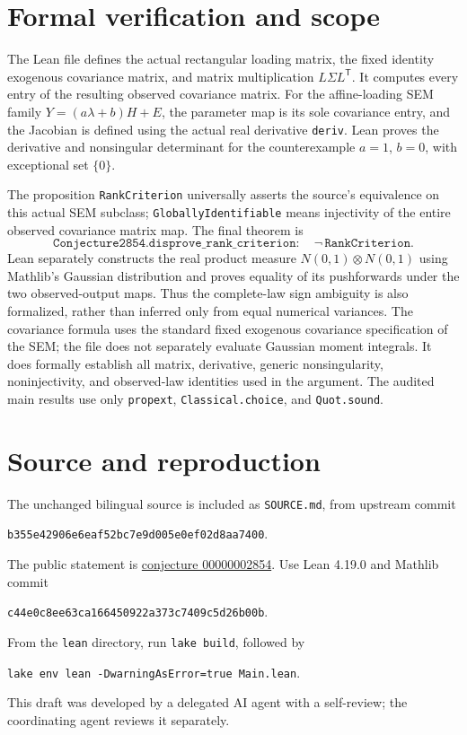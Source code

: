 \documentclass[11pt]{article}
\begin{document}
\section*{Formal verification and scope}
The Lean file defines the actual rectangular loading matrix, the fixed
identity exogenous covariance matrix, and matrix multiplication
$L\Sigma L^{\mathsf T}$. It computes every entry of the resulting
observed covariance matrix. For the affine-loading SEM family
$Y=(a\lambda+b)H+E$, the parameter map is its sole covariance entry,
and the Jacobian is defined using the actual real derivative
\texttt{deriv}. Lean proves the derivative and nonsingular determinant
for the counterexample $a=1$, $b=0$, with exceptional set $\{0\}$.

The proposition \texttt{RankCriterion} universally asserts the source's
equivalence on this actual SEM subclass; \texttt{GloballyIdentifiable}
means injectivity of the entire observed covariance matrix map.
The final theorem is
\[
\texttt{Conjecture2854.disprove\_rank\_criterion}:
\quad\neg\,\texttt{RankCriterion}.
\]
Lean separately constructs the real product measure
$N(0,1)\otimes N(0,1)$ using Mathlib's Gaussian distribution and proves
equality of its pushforwards under the two observed-output maps.
Thus the complete-law sign ambiguity is also formalized, rather than
inferred only from equal numerical variances.
The covariance formula uses the standard fixed exogenous covariance
specification of the SEM; the file does not separately evaluate
Gaussian moment integrals. It does formally establish all matrix,
derivative, generic nonsingularity, noninjectivity, and observed-law
identities used in the argument. The audited main results use only
\texttt{propext}, \texttt{Classical.choice}, and \texttt{Quot.sound}.

\section*{Source and reproduction}
The unchanged bilingual source is included as \texttt{SOURCE.md}, from
upstream commit
\begin{center}\small
\texttt{b355e42906e6eaf52bc7e9d005e0ef02d8aa7400}.
\end{center}
The public statement is
\href{https://github.com/The-Last-Math-Competition/The-Last-Math-Competition/blob/b355e42906e6eaf52bc7e9d005e0ef02d8aa7400/conjectures/00000002854.md}{conjecture 00000002854}.
Use Lean 4.19.0 and Mathlib commit
\begin{center}\small
\texttt{c44e0c8ee63ca166450922a373c7409c5d26b00b}.
\end{center}
From the \texttt{lean} directory, run \texttt{lake build}, followed by
\begin{center}
\texttt{lake env lean -DwarningAsError=true Main.lean}.
\end{center}
This draft was developed by a delegated AI agent with a self-review;
the coordinating agent reviews it separately.
\end{document}
